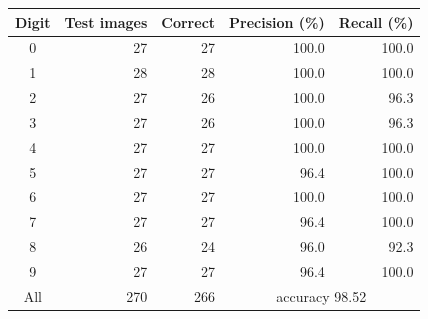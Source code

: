 \begin{tabular}{crrrr}
\toprule
Digit & Test images & Correct & Precision (\%) & Recall (\%)\\
\midrule
0 & 27 & 27 & 100.0 & 100.0\\
1 & 28 & 28 & 100.0 & 100.0\\
2 & 27 & 26 & 100.0 & 96.3\\
3 & 27 & 26 & 100.0 & 96.3\\
4 & 27 & 27 & 100.0 & 100.0\\
5 & 27 & 27 & 96.4 & 100.0\\
6 & 27 & 27 & 100.0 & 100.0\\
7 & 27 & 27 & 96.4 & 100.0\\
8 & 26 & 24 & 96.0 & 92.3\\
9 & 27 & 27 & 96.4 & 100.0\\
\midrule
All & 270 & 266 & \multicolumn{2}{c}{accuracy 98.52}\\
\bottomrule
\end{tabular}

